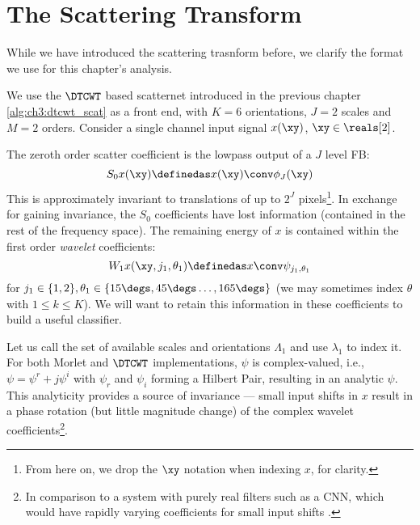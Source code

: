 \section{The Scattering Transform} \label{sec:ch4:scatternet}
While we have introduced the scattering trasnform before, we clarify the format
we use for this chapter's analysis. 

We use the $\DTCWT$ based scatternet introduced in the previous chapter 
\autoref{alg:ch3:dtcwt_scat} as a front end, with $K=6$ orientations, $J=2$
scales and $M=2$ orders. Consider a single channel input signal $x(\xy)$, $\xy
\in \reals[2]$.

The zeroth order scatter coefficient is the lowpass output of a $J$
level FB: 
\begin{equation}
  S_0x(\xy) \definedas x(\xy) \conv \phi_J(\xy)
\end{equation}
This is approximately invariant to translations of up to $2^J$ pixels\footnote{From here on,
we drop the $\xy$ notation when indexing $x$, for clarity.}. In exchange for
gaining invariance, the $S_0$ coefficients have lost information
(contained in the rest of the frequency space). The remaining energy of $x$ is
contained within the first order \emph{wavelet} coefficients:
\begin{equation}
  W_1x(\xy, j_1, \theta_1) \definedas x \conv \psi_{j_1, \theta_1}
\end{equation}
for $j_1\in\{1, 2\}, \theta_1\in\{15\degs, 45\degs \ldots, 165\degs\}$ (we may 
sometimes index $\theta$ with $1 \leq k \leq K$). We will want to
retain this information in these coefficients to build a useful classifier.

Let us call the set of available scales and orientations $\Lambda_1$ and use
$\lambda_1$ to index it. For both Morlet and $\DTCWT$ implementations, $\psi$
is complex-valued, i.e., $\psi = \psi^r + j\psi^i$ with $\psi_r$ and $\psi_i$
forming a Hilbert Pair, resulting in an analytic $\psi$.
 This analyticity provides a source of invariance --- small input shifts in $x$
 result in a phase rotation (but little magnitude change) of the complex wavelet
 coefficients\footnote{In comparison to a system with purely real filters such
 as a CNN, which would have rapidly varying coefficients for small input shifts
 \cite{kingsbury_complex_2001}.}.


